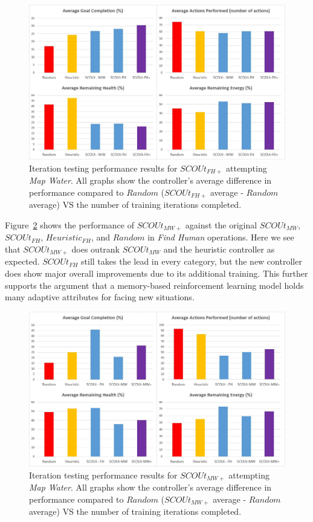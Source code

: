\begin{figure}[!htb]
  \includegraphics[width=1.0\columnwidth]{Figures/Results/Experiment2/AdditionalTraining/FindHumanPlus.JPG}
  \caption{Iteration testing performance results for $SCOUt_{FH+}$ attempting \textit{Map Water}. All graphs show the controller's average difference in performance compared to $Random$ ($SCOUt_{FH+}$ average - $Random$ average) VS the number of training iterations completed.}
  \label{fig:findhumanplus_test_results}
\end{figure}


Figure~\ref{fig:mapwaterplus_test_results} shows the performance of $SCOUt_{MW+}$ against the original $SCOUt_{MW}$, $SCOUt_{FH}$, $Heuristic_{FH}$, and $Random$ in \textit{Find Human} operations.
Here we see that $SCOUt_{MW+}$ does outrank $SCOUt_{MW}$ and the heuristic controller as expected.
$SCOUt_{FH}$ still takes the lead in every category, but the new controller does show major overall improvements due to its additional training.
This further supports the argument that a memory-based reinforcement learning model holds many adaptive attributes for facing new situations.


\begin{figure}[!htb]
  \includegraphics[width=1.0\columnwidth]{Figures/Results/Experiment2/AdditionalTraining/MapWaterPlus.JPG}
  \caption{Iteration testing performance results for $SCOUt_{MW+}$ attempting \textit{Map Water}. All graphs show the controller's average difference in performance compared to $Random$ ($SCOUt_{MW+}$ average - $Random$ average) VS the number of training iterations completed.}
  \label{fig:mapwaterplus_test_results}
\end{figure}



